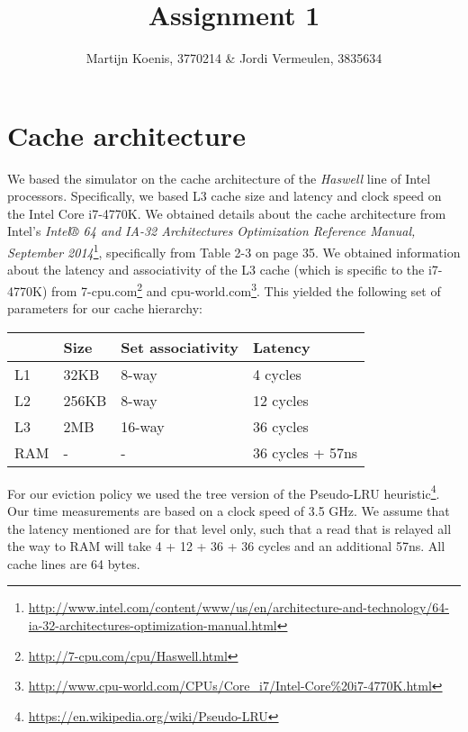 \documentclass[10pt,a4paper,oneside]{article}
\title{Assignment 1}
\author{Martijn Koenis, 3770214 \& Jordi Vermeulen, 3835634}
\date{}
\begin{document}
\maketitle
\vspace{-5em}

\section{Cache architecture}
We based the simulator on the cache architecture of the \emph{Haswell} line of Intel processors. Specifically, we based L3 cache size and latency and clock speed on the Intel Core i7-4770K. We obtained details about the cache architecture from Intel's \emph{Intel® 64 and IA-32 Architectures Optimization Reference Manual, September 2014}\footnote{\url{http://www.intel.com/content/www/us/en/architecture-and-technology/64-ia-32-architectures-optimization-manual.html}}, specifically from Table 2-3 on page 35. We obtained information about the latency and associativity of the L3 cache (which is specific to the i7-4770K) from 7-cpu.com\footnote{\url{http://7-cpu.com/cpu/Haswell.html}} and cpu-world.com\footnote{\url{http://www.cpu-world.com/CPUs/Core\_i7/Intel-Core\%20i7-4770K.html}}. This yielded the following set of parameters for our cache hierarchy:

\begin{center}
\begin{tabular}{l| l l l}
	& Size	& Set associativity	& Latency			\\ \hline
L1	& 32KB	& 8-way				& 4 cycles			\\
L2	& 256KB	& 8-way				& 12 cycles			\\
L3	& 2MB	& 16-way			& 36 cycles			\\
RAM	& -		& -					& 36 cycles + 57ns	
\end{tabular}
\end{center}

\noindent
For our eviction policy we used the tree version of the Pseudo-LRU heuristic\footnote{\url{https://en.wikipedia.org/wiki/Pseudo-LRU}}. Our time measurements are based on a clock speed of 3.5 GHz. We assume that the latency mentioned are for that level only, such that a read that is relayed all the way to RAM will take 4 + 12 + 36 + 36 cycles and an additional 57ns. All cache lines are 64 bytes.
\end{document}
